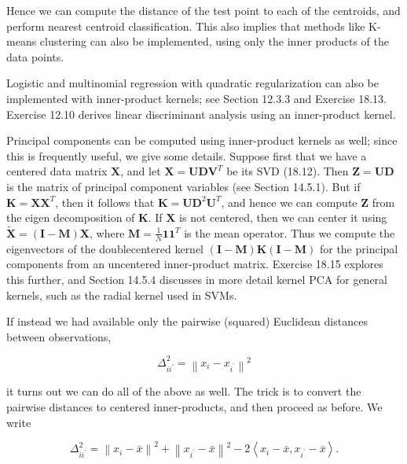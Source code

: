 \documentclass[10pt]{article}
\begin{document}
Hence we can compute the distance of the test point to each of the centroids, and perform nearest centroid classification. This also implies that methods like K-means clustering can also be implemented, using only the inner products of the data points.

Logistic and multinomial regression with quadratic regularization can also be implemented with inner-product kernels; see Section 12.3.3 and Exercise 18.13. Exercise 12.10 derives linear discriminant analysis using an inner-product kernel.

Principal components can be computed using inner-product kernels as well; since this is frequently useful, we give some details. Suppose first that we have a centered data matrix $\mathbf{X}$, and let $\mathbf{X}=\mathbf{U D V}^{T}$ be its SVD (18.12). Then $\mathbf{Z}=\mathbf{U D}$ is the matrix of principal component variables (see Section 14.5.1). But if $\mathbf{K}=\mathbf{X} \mathbf{X}^{T}$, then it follows that $\mathbf{K}=\mathbf{U D}^{2} \mathbf{U}^{T}$, and hence we can compute $\mathbf{Z}$ from the eigen decomposition of $\mathbf{K}$. If $\mathbf{X}$ is not centered, then we can center it using $\tilde{\mathbf{X}}=(\mathbf{I}-\mathbf{M}) \mathbf{X}$, where $\mathbf{M}=\frac{1}{N} \mathbf{1 1}^{T}$ is the mean operator. Thus we compute the eigenvectors of the doublecentered kernel $(\mathbf{I}-\mathbf{M}) \mathbf{K}(\mathbf{I}-\mathbf{M})$ for the principal components from an uncentered inner-product matrix. Exercise 18.15 explores this further, and Section 14.5.4 discusses in more detail kernel PCA for general kernels, such as the radial kernel used in SVMs.

If instead we had available only the pairwise (squared) Euclidean distances between observations,


\begin{equation*}
\Delta_{i i^{\prime}}^{2}=\left\|x_{i}-x_{i^{\prime}}\right\|^{2} \tag{18.29}
\end{equation*}


it turns out we can do all of the above as well. The trick is to convert the pairwise distances to centered inner-products, and then proceed as before. We write


\begin{equation*}
\Delta_{i i^{\prime}}^{2}=\left\|x_{i}-\bar{x}\right\|^{2}+\left\|x_{i^{\prime}}-\bar{x}\right\|^{2}-2\left\langle x_{i}-\bar{x}, x_{i^{\prime}}-\bar{x}\right\rangle . \tag{18.30}
\end{equation*}
\end{document}
